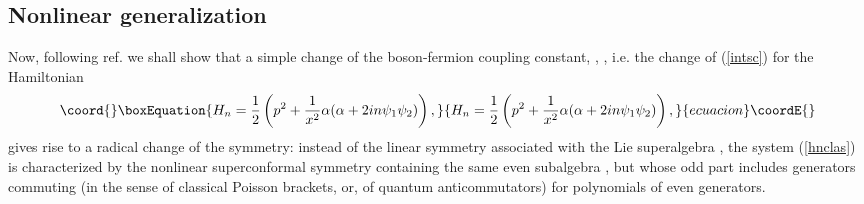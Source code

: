 \documentclass[a4paper,12pt]{article}
\def\N{\mathbb N}
\begin{document}
\subsection{Nonlinear generalization}
Now, following ref. \cite{P1}
we shall show that a simple change of the
boson-fermion coupling constant,
\coordHE{}, \myHighlight{$n\in \N$}\coordHE{},
i.e. the change of (\ref{intsc}) for the Hamiltonian
\begin{equation}\coord{}\boxEquation{
H_n=\frac{1}{2}
\left(p^2+\frac{1}{x^2}\alpha(\alpha+2in\psi_1
\psi_2)\right),
\label{hnclas}
}{
H_n=\frac{1}{2}
\left(p^2+\frac{1}{x^2}\alpha(\alpha+2in\psi_1
\psi_2)\right),
}{ecuacion}\coordE{}\end{equation}
gives rise to a radical change of
the symmetry:
instead of the linear symmetry associated
with the Lie superalgebra
\coordHE{}, the system (\ref{hnclas}) is characterized
by the nonlinear superconformal symmetry
containing the same even subalgebra
\coordHE{},
but whose odd part includes  \coordHE{} generators
commuting (in the sense of classical Poisson brackets,
or, of quantum anticommutators)
for polynomials of even generators.
\end{document}
